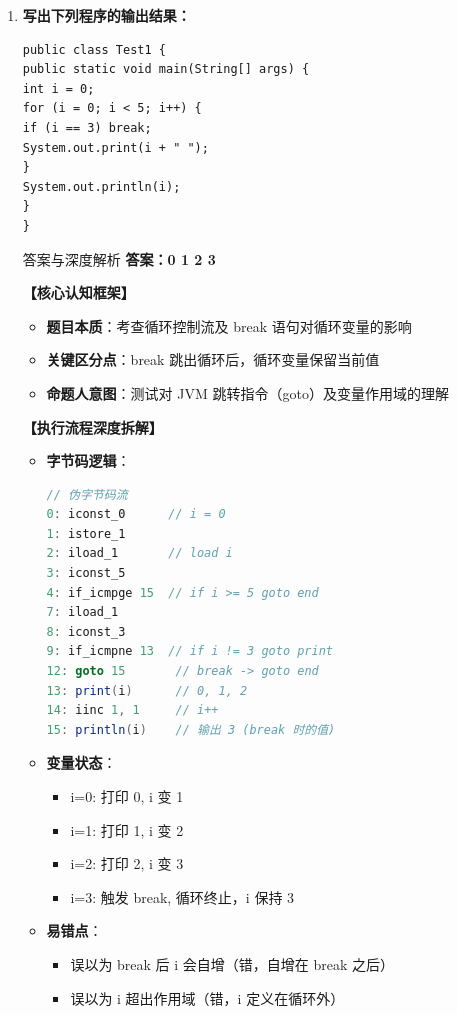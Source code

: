 \documentclass[12pt, a4paper]{ctexart}
\begin{document}
\begin{enumerate}[label=\textbf{\arabic*.}, leftmargin=*, itemsep=1.5em]
	\item \textbf{写出下列程序的输出结果：}
	      \begin{lstlisting}[style=JavaExam]
public class Test1 {
public static void main(String[] args) {
int i = 0;
for (i = 0; i < 5; i++) {
if (i == 3) break;
System.out.print(i + " ");
}
System.out.println(i);
}
}
\end{lstlisting}
	      \begin{bluebox}{答案与深度解析}
		      \textbf{答案：0 1 2 3}

		      \textbf{【核心认知框架】}
		      \begin{itemize}[leftmargin=*, nosep]
			      \item \textbf{题目本质}：考查循环控制流及 break 语句对循环变量的影响
			      \item \textbf{关键区分点}：break 跳出循环后，循环变量保留当前值
			      \item \textbf{命题人意图}：测试对 JVM 跳转指令（goto）及变量作用域的理解
		      \end{itemize}

		      \textbf{【执行流程深度拆解】}
		      \begin{itemize}[leftmargin=*, nosep]
			      \item \textbf{字节码逻辑}：
			            \begin{lstlisting}[language=Java]
// 伪字节码流
0: iconst_0      // i = 0
1: istore_1
2: iload_1       // load i
3: iconst_5
4: if_icmpge 15  // if i >= 5 goto end
7: iload_1
8: iconst_3
9: if_icmpne 13  // if i != 3 goto print
12: goto 15       // break -> goto end
13: print(i)      // 0, 1, 2
14: iinc 1, 1     // i++
15: println(i)    // 输出 3 (break 时的值)
    \end{lstlisting}
			      \item \textbf{变量状态}：
			            \begin{itemize}
				            \item i=0: 打印 0, i 变 1
				            \item i=1: 打印 1, i 变 2
				            \item i=2: 打印 2, i 变 3
				            \item i=3: 触发 break, 循环终止，i 保持 3
			            \end{itemize}
			      \item \textbf{易错点}：
			            \begin{itemize}
				            \item 误以为 break 后 i 会自增（错，自增在 break 之后）
				            \item 误以为 i 超出作用域（错，i 定义在循环外）
			            \end{itemize}
		      \end{itemize}


\end{bluebox}
\end{enumerate}
\end{document}

